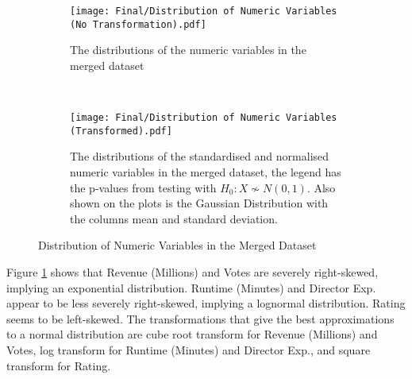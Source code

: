         \begin{figure}[H]
            \centering
            \begin{subfigure}[b]{0.75\textwidth}
                \centering
                \texttt{[image: Final/Distribution of Numeric Variables (No Transformation).pdf]}
            \end{subfigure}
            \begin{subfigure}[b]{0.2\textwidth}
                \centering
                \captionsetup{justification=justified,singlelinecheck=false}
                \caption{The distributions of the numeric variables in the merged dataset}\label{fig-distribution-of-numeric-variable}
            \end{subfigure}
            \\
            \begin{subfigure}[b]{0.75\textwidth}
                \centering
                \texttt{[image: Final/Distribution of Numeric Variables (Transformed).pdf]}
            \end{subfigure}
            \begin{subfigure}[b]{0.2\textwidth}
                \centering
                \captionsetup{justification=justified,singlelinecheck=false}
                \caption{The distributions of the standardised and normalised numeric variables
                        in the merged dataset, the legend has the p-values from testing with 
                        $H_{0}: X \not\sim N(0,1)$. Also shown on the plots is the Gaussian Distribution
                        with the columns mean and standard deviation.}
                \label{fig-transformed-distribution-of-numeric-variable}
            \end{subfigure}
            \caption{Distribution of Numeric Variables in the Merged Dataset}
            \label{fig-numeric-variable-distribution}
        \end{figure}
                  
        Figure \ref*{fig-distribution-of-numeric-variable} shows that Revenue (Millions) and Votes are
        severely right-skewed, implying an exponential distribution. Runtime
        (Minutes) and Director Exp. appear to be less severely right-skewed,
        implying a lognormal distribution. Rating seems to be left-skewed. The
        transformations that give the best approximations to a normal
        distribution are cube root transform for Revenue (Millions) and Votes,
        log transform for Runtime (Minutes) and Director Exp., and square
        transform for Rating.
        
